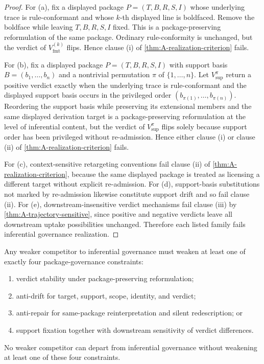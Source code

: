 \begin{proof}
For (a), fix a displayed package $P=(T,B,R,S,I)$ whose underlying trace is rule-conformant and whose $k$-th displayed line is boldfaced. Remove the boldface while leaving $T,B,R,S,I$ fixed. This is a package-preserving reformulation of the same package. Ordinary rule-conformity is unchanged, but the verdict of $V^{(k)}_{\mathrm{fmt}}$ flips. Hence clause (i) of \cref{thm:A-realization-criterion} fails.

For (b), fix a displayed package $P=(T,B,R,S,I)$ with support basis $B=(b_1,\ldots,b_n)$ and a nontrivial permutation $\pi$ of $\{1,\ldots,n\}$. Let $V^{\pi}_{\mathrm{sup}}$ return a positive verdict exactly when the underlying trace is rule-conformant and the displayed support basis occurs in the privileged order $(b_{\pi(1)},\ldots,b_{\pi(n)})$. Reordering the support basis while preserving its extensional members and the same displayed derivation target is a package-preserving reformulation at the level of inferential content, but the verdict of $V^{\pi}_{\mathrm{sup}}$ flips solely because support order has been privileged without re-admission. Hence either clause (i) or clause (ii) of \cref{thm:A-realization-criterion} fails.

For (c), context-sensitive retargeting conventions fail clause (ii) of \cref{thm:A-realization-criterion}, because the same displayed package is treated as licensing a different target without explicit re-admission. For (d), support-basis substitutions not marked by re-admission likewise constitute support drift and so fail clause (ii). For (e), downstream-insensitive verdict mechanisms fail clause (iii) by \cref{thm:A-trajectory-sensitive}, since positive and negative verdicts leave all downstream uptake possibilities unchanged. Therefore each listed family fails inferential governance realization.
\end{proof}

\begin{proposition}
\label{prop:A-weaker-uptake-decomposition}
Any weaker competitor to inferential governance must weaken at least one of exactly four package-governance constraints:
\begin{enumerate}[label=(\roman*), leftmargin=2.5em]
    \item verdict stability under package-preserving reformulation;
    \item anti-drift for target, support, scope, identity, and verdict;
    \item anti-repair for same-package reinterpretation and silent redescription; or
    \item support fixation together with downstream sensitivity of verdict differences.
\end{enumerate}
No weaker competitor can depart from inferential governance without weakening at least one of these four constraints.
\end{proposition}

